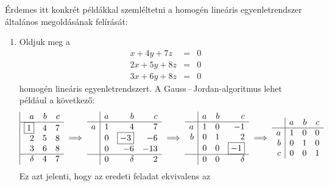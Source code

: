 \documentclass[a4paper, showtrims]{memoir}
\theoremstyle{plain}
\theoremstyle{remark}
\theoremstyle{definition}
\begin{document}
Érdemes itt konkrét példákkal szemléltetni a homogén lineáris egyenletrendszer általános megoldásának felírását:
\begin{enumerate}
	\item
    Oldjuk meg a
    \begin{eqnarray*}
      x+4y+7z&=& 0\\
	  2x+5y+8z&=& 0\\
	  3x+6y+8z&=& 0
    \end{eqnarray*}
    homogén  lineáris egyenletrendszert.
    A Gauss\,--\,Jordan-algoritmus  lehet például a következő:
     \[
     \begin{array}{|rrr}
     a         & b & c \\
      \hline
      \boxed{1} & 4 & 7 \\
      2         & 5 & 8 \\
      3         & 6 & 8 \\
      \hline
      \delta    & 4 & 7
      \end{array}
      \implies
      \begin{array}{r|rrr}
        & a & b          & c   \\
      \hline
      a & 1 & 4          & 7   \\
        & 0 & \boxed{-3} & -6  \\
        & 0 & -6         & -13 \\
      \hline
        & 0 & \delta     & 2
      \end{array}
      \implies
      \begin{array}{r|rrr}
        & a & b & c          \\
      \hline
      a & 1 & 0 & -1         \\
      b & 0 & 1 & 2          \\
        & 0 & 0 & \boxed{-1} \\
      \hline
        & 0 & 0 & \delta
      \end{array}
      \implies
      \begin{array}{r|rrr}
        & a & b & c \\
      \hline
      a & 1 & 0 & 0 \\
      b & 0 & 1 & 0 \\
      c & 0 & 0 & 1
      \end{array}
      \]
      Ez azt jelenti, hogy az eredeti feladat ekvivalens az

\end{enumerate}
\end{document}
